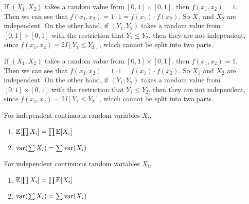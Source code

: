 \begin{note}
  \begin{field}
    \begin{eg}
      If $(X_1, X_2)$ takes a random value from $[0, 1] \times [0, 1]$, then $f(x_1, x_2) = 1$. Then we can see that $f(x_1, x_2) = 1\cdot 1 = f(x_1)\cdot f(x_2)$. So $X_1$ and $X_2$ are independent.
      On the other hand, if $(Y_1, Y_2)$ takes a random value from $[0, 1] \times [0, 1]$ with the restriction that $Y_1 \leq Y_2$, then they are not independent, since $f(x_1, x_2) = 2 I[Y_1 \leq Y_2]$, which cannot be split into two parts.
    \end{eg}
  \end{field}
  \begin{field}
    \begin{eg}
      If $(X_1, X_2)$ takes a random value from $[0, 1] \times [0, 1]$, then $f(x_1, x_2) = 1$. Then we can see that $f(x_1, x_2) = 1\cdot 1 = f(x_1)\cdot f(x_2)$. So $X_1$ and $X_2$ are independent.
      On the other hand, if $(Y_1, Y_2)$ takes a random value from $[0, 1] \times [0, 1]$ with the restriction that $Y_1 \leq Y_2$, then they are not independent, since $f(x_1, x_2) = 2 I[Y_1 \leq Y_2]$, which cannot be split into two parts.
    \end{eg}
  \end{field}
  \xplain{}%
\end{note}

\begin{note}
  \begin{field}
    \begin{prop}
      For independent continuous random variables $X_i$,
      \begin{enumerate}
        \item $\mathbb{E} [\prod X_i] = \prod \mathbb{E} [X_i]$
        \item $\operatorname{var} (\sum X_i) = \sum \operatorname{var} (X_i)$
      \end{enumerate}
    \end{prop}
  \end{field}
  \begin{field}
    \begin{prop}
      For independent continuous random variables $X_i$,
      \begin{enumerate}
        \item $\mathbb{E} [\prod X_i] = \prod \mathbb{E} [X_i]$
        \item $\operatorname{var} (\sum X_i) = \sum \operatorname{var} (X_i)$
      \end{enumerate}
    \end{prop}
  \end{field}
  \xplain{}%
\end{note}

